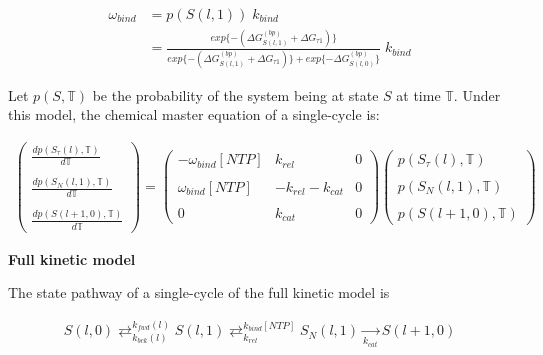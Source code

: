 \documentclass[10pt,letterpaper]{article}
\begin{document}
\begin{align}
    \omega_{bind} &= p( S(l,1) ) \; k_{bind} \\
    &= \frac{ exp \{ -(\Delta G^{(bp)}_{S(l,1)} + \Delta G _{\tau 1}) \} }{ exp \{ -(\Delta G^{(bp)}_{S(l,1)} + \Delta G _{\tau 1}) \} + exp \{ -\Delta G^{(bp)}_{S(l,0)} \}} \; k_{bind}
\end{align}



Let $p(S, \mathbb{T})$ be the probability of the system being at state $S$ at time $\mathbb{T}$. Under this model, the chemical master equation of a single-cycle is:



\begin{eqnarray}
    \begin{pmatrix}
        \frac{d p( S_\tau(l), \mathbb{T} )}{d\mathbb{T}} \\ \\
        \frac{d p( S_N(l,1), \mathbb{T} )}{d\mathbb{T}} \\ \\
        \frac{d p( S(l+1,0), \mathbb{T} )}{d\mathbb{T}}
    \end{pmatrix} =
    \begin{pmatrix}
        -\omega_{bind}[NTP] & k_{rel} & 0 \\ \\
        \omega_{bind}[NTP] & -k_{rel} - k_{cat} & 0 \\ \\
        0 & k_{cat} & 0
    \end{pmatrix}
    \begin{pmatrix}
        p( S_\tau(l), \mathbb{T} ) \\ \\
        p( S_N(l,1), \mathbb{T} ) \\ \\
        p( S(l+1,0), \mathbb{T} )
    \end{pmatrix}
\end{eqnarray}


\textbf{Full kinetic model} \par


The state pathway of a single-cycle of the full kinetic model is


\begin{eqnarray}
S(l,0) \mathop{\rightleftarrows}_{k_{bck}(l)}^{k_{fwd}(l)}  S(l,1) \mathop{\rightleftarrows}_{k_{rel}}^{k_{bind}[NTP]} S_N(l,1)  \xrightarrow[k_{cat}]{} S(l+1,0)
\end{eqnarray}
\end{document}
